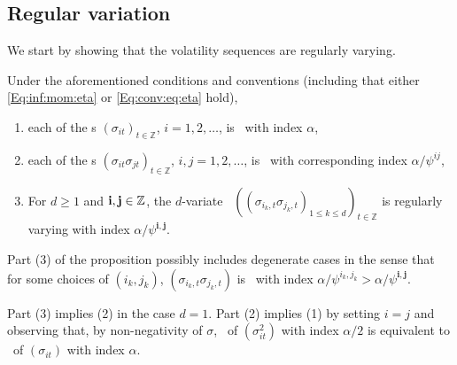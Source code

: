 \subsection{Regular variation}\label{subsec:regvar2}
We start by showing that the volatility sequences are regularly varying.
\begin{proposition}\label{prop:rv:1} Under the aforementioned conditions and conventions (including that 
either \eqref{Eq:inf:mom:eta} or \eqref{Eq:conv:eq:eta} hold), 
\begin{enumerate}
\item
each of the \seq s 
$(\sigma_{it})_{t \in \mathbb{Z}}$, $i=1,2,\ldots$, is \regvary\ with index $\alpha$,
\item
each of the \seq s $(\sigma_{it}\sigma_{jt})_{t \in \mathbb{Z}}$, $i,j=1,2,\ldots$, is \regvary\ with corresponding index  $\alpha/\psi^{ij}$,
\item
For $d\geq 1$ and $\mathbf{i},\mathbf{j}\in{\mathbb Z}$, the $d$-variate \seq\ 
$((\sigma_{i_k,t}\sigma_{j_k,t})_{1\leq k \leq d})_{t \in \mathbb{Z}}$ is regularly 
varying with index $\alpha/\psi^{\mathbf{i},\mathbf{j}}$.
\end{enumerate}
\end{proposition}
\bre Part (3) of the proposition possibly includes degenerate cases in the sense that for some choices of $(i_k,j_k)$, 
$(\sigma_{i_k,t}\sigma_{j_k,t})$ is \regvary\ with index $\alpha/\psi^{i_k,j_k}> \alpha/\psi^{\mathbf{i},\mathbf{j}}$. 
\par
Part (3) implies (2) in the case $d=1$. Part (2) implies (1) by setting $i=j$ and observing that, 
by non-negativity of $\sigma$,  \regvar\ of $(\sigma_{it}^2)$
with index $\alpha/2$ is equivalent to \regvar\ of $(\sigma_{it})$ with index $\alpha$. 
\ere
